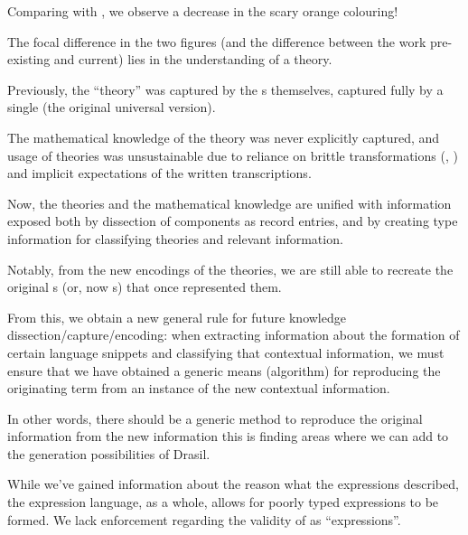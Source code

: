 \theoriesWithModelKinds{}

Comparing  with , we
observe a decrease in the scary orange colouring!

The focal difference in the two figures (and the difference between the work
pre-existing and current) lies in the understanding of a theory.

Previously, the ``theory'' was captured by the \RelationConcept{}s themselves,
captured fully by a single \Expr{} (the original universal version).

The mathematical knowledge of the theory was never explicitly captured, and
usage of theories was unsustainable due to reliance on brittle transformations
(\relToQD{}, ) and implicit expectations of the
written transcriptions.

Now, the theories and the mathematical knowledge are unified with information
exposed both by dissection of components as record entries, and by creating type
information for classifying theories and relevant information.

Notably, from the new encodings of the theories, we are still able to recreate
the original \Expr{}s (or, now \ModelExpr{}s) that once represented them.

\theoriesSideBySideModelKinds{}


From this, we obtain a new general rule for future knowledge
dissection/capture/encoding: when extracting information about the formation of
certain language snippets and classifying that contextual information, we must
ensure that we have obtained a generic means (algorithm) for reproducing the
originating term from an instance of the new contextual information.

In other words, there should be a generic method to reproduce the original
information from the new information \textemdash{} this is finding areas where
we can add to the generation possibilities of Drasil.




While we've gained information about the reason what the expressions described,
the expression language, as a whole, allows for poorly typed expressions to be
formed. We lack enforcement regarding the validity of \Expr{} as
``expressions''.




